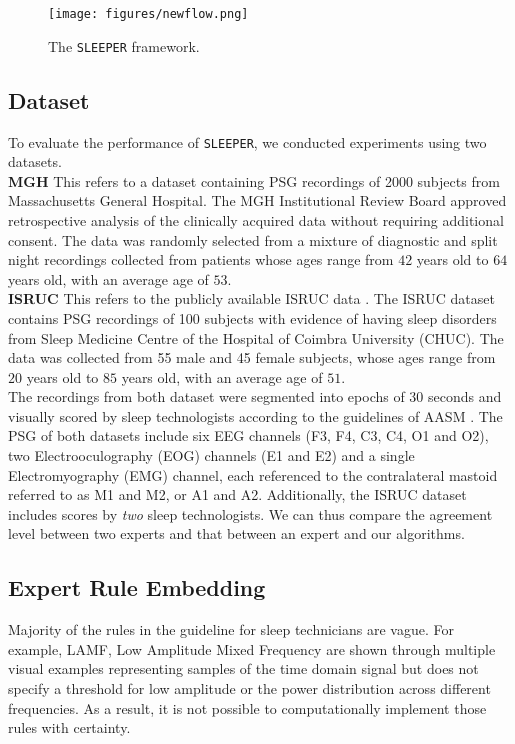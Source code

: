 \documentclass[pmlr]{jmlr}
\newcommand{\mname}
{\texttt{SLEEPER}\xspace}
\begin{document}
\begin{figure}[htbp]
  \centering 
  \texttt{[image: figures/newflow.png]} 
  \caption{The \mname framework.}
  \label{fig:flow} 
\end{figure} 

\subsection{Dataset}
To evaluate the performance of \mname, we conducted experiments using two datasets.\\

\noindent\textbf{MGH} This refers to a dataset containing PSG recordings of 2000 subjects from Massachusetts General Hospital. The MGH Institutional Review Board approved retrospective analysis of the clinically acquired data without requiring additional consent. The data was randomly selected from a mixture of diagnostic and split night recordings collected from patients whose ages range from $42$ years old to $64$ years old, with an average age of $53$. \\

\noindent\textbf{ISRUC} This refers to the publicly available ISRUC data \citep{isruc}. The ISRUC dataset contains PSG recordings of 100 subjects with evidence of having sleep disorders from Sleep Medicine Centre of the Hospital of Coimbra University (CHUC). The data was collected from 55 male and 45 female subjects, whose ages range from $20$ years old to $85$ years old, with an average age of $51$.\\


The recordings from both dataset were segmented into epochs of 30 seconds and visually scored by sleep technologists according to the guidelines of AASM \citep{berry2012aasm}. The PSG of both datasets include six EEG channels (F3, F4, C3, C4, O1 and O2), two Electrooculography (EOG) channels (E1 and E2) and a single Electromyography (EMG) channel, each referenced to the contralateral mastoid referred to as M1 and M2, or A1 and A2. Additionally, the ISRUC dataset includes scores by \textit{two} sleep technologists. We can thus compare the agreement level between two experts and that between an expert and our algorithms.



 


\subsection{Expert Rule Embedding} \label{sec:feature}
Majority of the rules in the guideline for sleep technicians \citep{berry2012aasm} are vague. For example, LAMF, Low Amplitude Mixed Frequency are shown through multiple visual examples representing samples of the time domain signal but does not specify a threshold for low amplitude or the power distribution across different frequencies. As a result, it is not possible to computationally implement those rules with certainty. 
\end{document}
